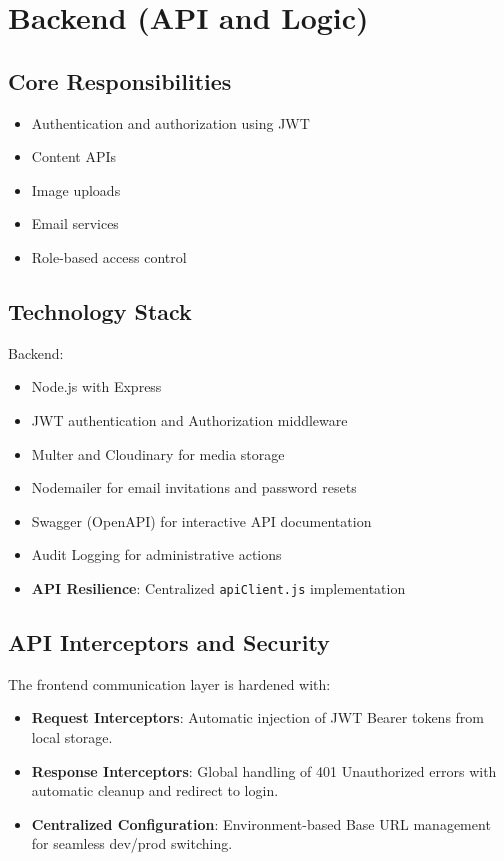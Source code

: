 \documentclass[12pt,a4paper]{article}
\begin{document}
\section{Backend (API and Logic)}

\subsection{Core Responsibilities}
\begin{itemize}
    \item Authentication and authorization using JWT
    \item Content APIs
    \item Image uploads
    \item Email services
    \item Role-based access control
\end{itemize}

\subsection{Technology Stack}

Backend:
\begin{itemize}
    \item Node.js with Express
    \item JWT authentication and Authorization middleware
    \item Multer and Cloudinary for media storage
    \item Nodemailer for email invitations and password resets
    \item Swagger (OpenAPI) for interactive API documentation
    \item Audit Logging for administrative actions
    \item \textbf{API Resilience}: Centralized \texttt{apiClient.js} implementation
\end{itemize}

\subsection{API Interceptors and Security}
The frontend communication layer is hardened with:
\begin{itemize}
    \item \textbf{Request Interceptors}: Automatic injection of JWT Bearer tokens from local storage.
    \item \textbf{Response Interceptors}: Global handling of 401 Unauthorized errors with automatic cleanup and redirect to login.
    \item \textbf{Centralized Configuration}: Environment-based Base URL management for seamless dev/prod switching.
\end{itemize}
\end{document}
